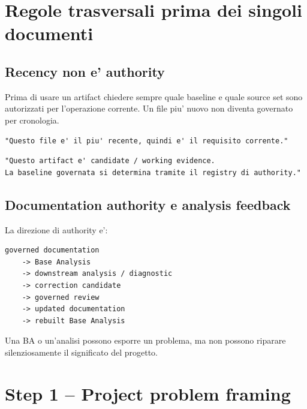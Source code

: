 \documentclass[11pt,a4paper]{article}
\begin{document}
\section{Regole trasversali prima dei singoli documenti}

\subsection{Recency non e' authority}

\begin{statusclosed}
Prima di usare un artifact chiedere sempre quale baseline e quale source set sono autorizzati per l'operazione corrente. Un file piu' nuovo non diventa governato per cronologia.
\end{statusclosed}

\begin{badbox}
\begin{lstlisting}
"Questo file e' il piu' recente, quindi e' il requisito corrente."
\end{lstlisting}
\end{badbox}

\begin{goodbox}
\begin{lstlisting}
"Questo artifact e' candidate / working evidence.
La baseline governata si determina tramite il registry di authority."
\end{lstlisting}
\end{goodbox}

\subsection{Documentation authority e analysis feedback}

La direzione di authority e':

\begin{lstlisting}
governed documentation
    -> Base Analysis
    -> downstream analysis / diagnostic
    -> correction candidate
    -> governed review
    -> updated documentation
    -> rebuilt Base Analysis
\end{lstlisting}

Una BA o un'analisi possono esporre un problema, ma non possono riparare silenziosamente il significato del progetto.

\section{Step 1 -- Project problem framing}
\end{document}
